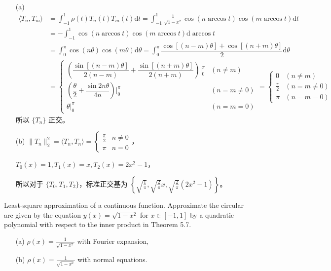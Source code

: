 \documentclass[lang=cn,a4paper,newtx,bibend=bibtex]{elegantpaper}
\newcommand{\dd}{\mathrm{d}}
\begin{document}
\begin{solution} ~~

\begin{enumerate}
\item[(a)]
\begin{equation*}
\begin{aligned}
  \langle T_n, T_m \rangle &= \int_{-1}^1 \rho(t) T_n(t) T_m(t) \dd t 
  = \int_{-1}^1 \frac{1}{\sqrt{1 - x^2}} \cos (n \arccos t)\cos (m \arccos t) \dd t \\
  &= - \int_{-1}^1 \cos (n \arccos t) \cos (m \arccos t) \dd \arccos t \\
  &= \int_0^{\pi} \cos (n \theta) \cos (m \theta) \dd \theta 
  = \int_0^{\pi} \dfrac{\cos [(n - m) \theta] + \cos [(n + m)\theta]}{2} \dd \theta \\
  &= \begin{cases}
      \left(\dfrac{\sin [(n - m) \theta]}{2(n - m)} + \dfrac{\sin [(n + m) \theta]}{2(n + m)} \right)\bigg |_0^{\pi} &(n \neq m)\\
      \left(\dfrac{\theta}2 + \dfrac{\sin 2n\theta}{4n}\right) \bigg|_0^{\pi} & (n = m \neq 0)\\
      \theta \big|_0^{\pi} & (n = m = 0)
  \end{cases} 
  = \begin{cases}
    0 & (n \neq m) \\
    \frac{\pi}2 & (n = m \neq 0)\\
    \pi & (n = m = 0)
\end{cases} 
\end{aligned}
\end{equation*}
所以 $\{T_n\}$ 正交。
\item[(b)]
$\| T_n \|_2^2 = \langle T_n, T_n \rangle = \begin{cases} \frac{\pi}2 & n \neq 0 \\ \pi & n = 0\end{cases}$，

$T_0(x) = 1, T_1(x) = x, T_2(x) = 2x^2 - 1$，

所以对于 $\{T_0, T_1, T_2\}$，标准正交基为 $\left\{\sqrt{\frac1{\pi}}, \sqrt{\frac2{\pi}} x, \sqrt{\frac2{\pi}} (2x^2 - 1)\right\}$。

\end{enumerate}
\end{solution}

\begin{prob}
  Least-square approximation of a continuous function.
  Approximate the circular arc given by the equation
  $y(x) = \sqrt{1 - x^2}$ for $x \in [−1, 1]$ by a quadratic polynomial
  with respect to the inner product in Theorem 5.7.
  \begin{enumerate}
    \item[(a)] $\rho(x) = \frac{1}{\sqrt{1 - x^2}}$ with Fourier expansion,
    \item[(b)] $\rho(x) = \frac{1}{\sqrt{1 - x^2}}$ with normal equations.
  \end{enumerate}
\end{prob}
\end{document}
